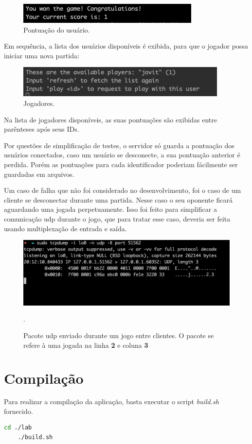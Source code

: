\documentclass[12pt,a4paper]{report}
\begin{document}
\begin{figure}[H]
    \includegraphics[width=\linewidth]{points.png}
    \caption{Pontuação do usuário.}
\end{figure}

\bigbreak

Em sequência, a lista dos usuários disponíveis é exibida, para que o jogador possa iniciar uma nova partida:

\begin{figure}[H]
    \includegraphics[width=\linewidth]{players.png}
    \caption{Jogadores.}
\end{figure}

Na lista de jogadores disponíveis, as suas pontuações são exibidas entre parênteses após seus IDs.

Por questões de simplificação de testes, o servidor só guarda a pontuação dos usuários conectados, caso um usuário se desconecte, a sua pontuação anterior é perdida. Porém as pontuações para cada identificador poderiam fácilmente ser guardadas em arquivos.

\bigbreak

Um caso de falha que não foi considerado no desenvolvimento, foi o caso de um cliente se desconectar durante uma partida. Nesse caso o seu oponente ficará aguardando uma jogada perpetuamente. Isso foi feito para simplificar a comunicação udp durante o jogo, que para tratar esse caso, deveria ser feita usando multiplexação de entrada e saída.

\begin{figure}[H]
    \includegraphics[width=\linewidth]{udp_datagram.png}
    \caption{Pacote udp enviado durante um jogo entre clientes. O pacote se refere à uma jogada na linha \textbf{2} e coluna \textbf{3}}.
\end{figure}

\section{Compilação}

Para realizar a compilação da aplicação, basta executar o script \emph{build.sh} fornecido.

\begin{lstlisting}[language=bash]
    cd ./lab
    ./build.sh
\end{lstlisting}
\end{document}
